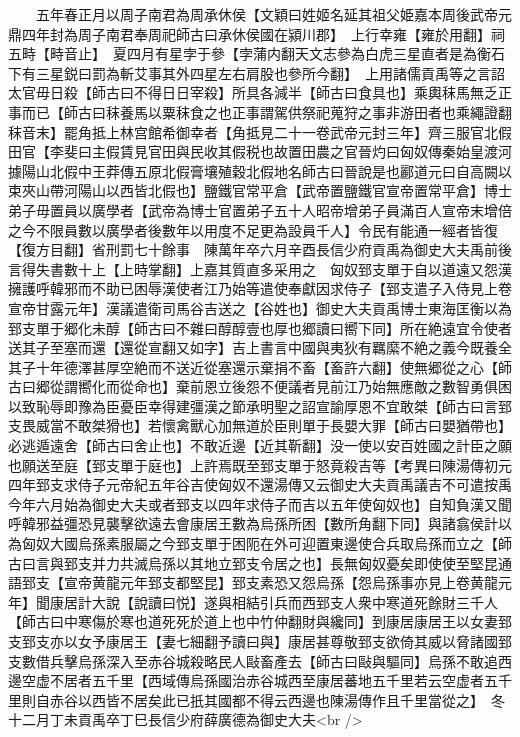 　　五年春正月以周子南君為周承休侯【文穎曰姓姬名延其祖父姫嘉本周後武帝元鼎四年封為周子南君奉周祀師古曰承休侯國在潁川郡】　上行幸雍【雍於用翻】祠五畤【畤音止】　夏四月有星孛于參【孛蒲内翻天文志參為白虎三星直者是為衡石下有三星鋭曰罰為斬艾事其外四星左右肩股也參所今翻】　上用諸儒貢禹等之言詔太官毋日殺【師古曰不得日日宰殺】所具各減半【師古曰食具也】乘輿秣馬無乏正事而已【師古曰秣養馬以粟秣食之也正事謂駕供祭祀蒐狩之事非游田者也乘繩證翻秣音末】罷角抵上林宫館希御幸者【角抵見二十一卷武帝元封三年】齊三服官北假田官【李斐曰主假賃見官田與民收其假税也故置田農之官晉灼曰匈奴傳秦始皇渡河據陽山北假中王莽傳五原北假膏壤殖穀北假地名師古曰晉說是也酈道元曰自高闕以束夾山帶河陽山以西皆北假也】鹽鐵官常平倉【武帝置鹽鐵官宣帝置常平倉】博士弟子毋置員以廣學者【武帝為博士官置弟子五十人昭帝增弟子員滿百人宣帝末增倍之今不限員數以廣學者後數年以用度不足更為設員千人】令民有能通一經者皆復【復方目翻】省刑罰七十餘事　陳萬年卒六月辛酉長信少府貢禹為御史大夫禹前後言得失書數十上【上時掌翻】上嘉其質直多采用之　匈奴郅支單于自以道遠又怨漢擁護呼韓邪而不助已困辱漢使者江乃始等遣使奉獻因求侍子【郅支遣子入侍見上卷宣帝甘露元年】漢議遣衛司馬谷吉送之【谷姓也】御史大夫貢禹博士東海匡衡以為郅支單于郷化未醇【師古曰不雜曰醇醇壹也厚也郷讀曰嚮下同】所在絶遠宜令使者送其子至塞而還【還從宣翻又如字】吉上書言中國與夷狄有羈縻不絶之義今既養全其子十年德澤甚厚空絶而不送近從塞還示棄捐不畜【畜許六翻】使無郷從之心【師古曰郷從謂嚮化而從命也】棄前恩立後怨不便議者見前江乃始無應敵之數智勇俱困以致恥辱即豫為臣憂臣幸得建彊漢之節承明聖之詔宣諭厚恩不宜敢桀【師古曰言郅支畏威當不敢桀猾也】若懷禽獸心加無道於臣則單于長嬰大罪【師古曰嬰猶帶也】必逃遁遠舍【師古曰舍止也】不敢近邊【近其靳翻】没一使以安百姓國之計臣之願也願送至庭【郅支單于庭也】上許焉既至郅支單于怒竟殺吉等【考異曰陳湯傳初元四年郅支求侍子元帝紀五年谷吉使匈奴不還湯傳又云御史大夫貢禹議吉不可遣按禹今年六月始為御史大夫或者郅支以四年求侍子而吉以五年使匈奴也】自知負漢又聞呼韓邪益彊恐見襲擊欲遠去會康居王數為烏孫所困【數所角翻下同】與諸翕侯計以為匈奴大國烏孫素服屬之今郅支單于困阨在外可迎置東邊使合兵取烏孫而立之【師古曰言與郅支并力共滅烏孫以其地立郅支令居之也】長無匈奴憂矣即使使至堅昆通語郅支【宣帝黄龍元年郅支都堅昆】郅支素恐又怨烏孫【怨烏孫事亦見上卷黄龍元年】聞康居計大說【說讀曰悦】遂與相結引兵而西郅支人衆中寒道死餘財三千人【師古曰中寒傷於寒也道死死於道上也中竹仲翻財與纔同】到康居康居王以女妻郅支郅支亦以女予康居王【妻七細翻予讀曰與】康居甚尊敬郅支欲倚其威以脅諸國郅支數借兵擊烏孫深入至赤谷城殺略民人敺畜產去【師古曰敺與驅同】烏孫不敢追西邊空虚不居者五千里【西域傳烏孫國治赤谷城西至康居蕃地五千里若云空虚者五千里則自赤谷以西皆不居矣此已扺其國都不得云西邊也陳湯傳作且千里當從之】　冬十二月丁未貢禹卒丁巳長信少府薛廣德為御史大夫<br />
